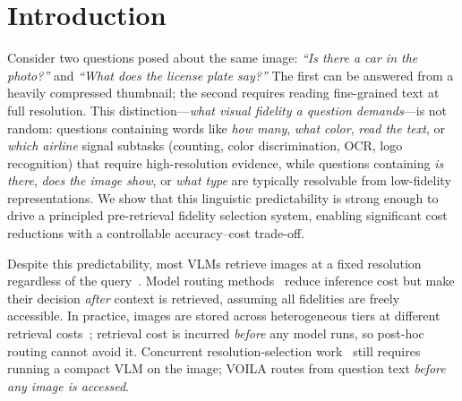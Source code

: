 \section{Introduction}\label{sec:intro}



Consider two questions posed about the same image: \emph{``Is there a car in the photo?''} and \emph{``What does the license plate say?''}
The first can be answered from a heavily compressed thumbnail; the second requires reading fine-grained text at full resolution.
This distinction---\emph{what visual fidelity a question demands}---is not random: questions containing words like \emph{how many}, \emph{what color}, \emph{read the text}, or \emph{which airline} signal subtasks (counting, color discrimination, OCR, logo recognition) that require high-resolution evidence, while questions containing \emph{is there}, \emph{does the image show}, or \emph{what type} are typically resolvable from low-fidelity representations.
We show that this linguistic predictability is strong enough to drive a principled pre-retrieval fidelity selection system, enabling significant cost reductions with a controllable accuracy--cost trade-off.

Despite this predictability, most VLMs retrieve images at a fixed resolution regardless of the query~\cite{alayrac2022flamingo, li2023blip2, liu2024visual, bai2023qwen}.
Model routing methods~\cite{chen2023frugalgpt, ding2024hybrid, wang2024routellm} reduce inference cost but make their decision \emph{after} context is retrieved, assuming all fidelities are freely accessible.
In practice, images are stored across heterogeneous tiers at different retrieval costs~\cite{lonn2019smartphonepictureorganizationhierarchical, aws_s3_storage_classes}; retrieval cost is incurred \emph{before} any model runs, so post-hoc routing cannot avoid it.
Concurrent resolution-selection work~\cite{kimhi2025cares} still requires running a compact VLM on the image; \textsc{VOILA} routes from question text \emph{before any image is accessed}.


